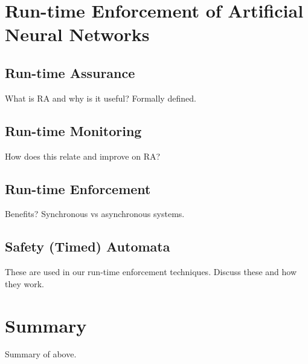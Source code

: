 \section{Run-time Enforcement of Artificial Neural Networks}
\subsection{Run-time Assurance}
What is RA and why is it useful? Formally defined.

\subsection{Run-time Monitoring}
How does this relate and improve on RA?

\subsection{Run-time Enforcement}
Benefits? Synchronous vs asynchronous systems. 

\subsection{Safety (Timed) Automata}
These are used in our run-time enforcement techniques. Discuss these and how they work.

\section{Summary}
Summary of above.